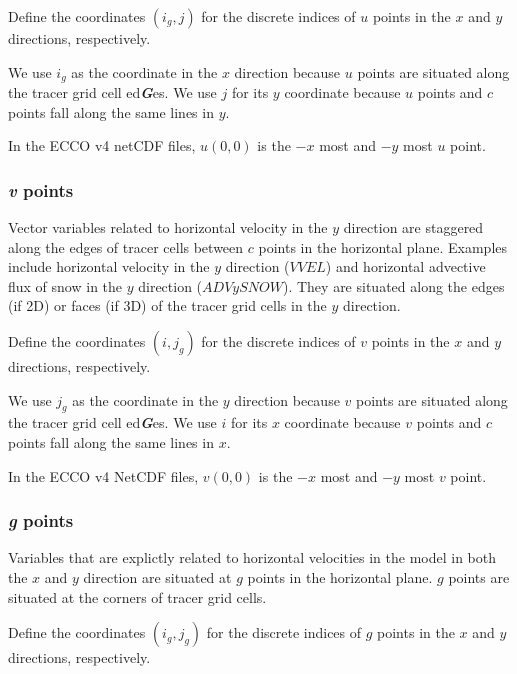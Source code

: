 \documentclass[11pt]{article}
\begin{document}
Define the coordinates \((i_g,j)\) for the discrete indices of \(u\)
points in the \(x\) and \(y\) directions, respectively.

We use \(i_g\) as the coordinate in the \(x\) direction because \(u\)
points are situated along the tracer grid cell ed\textbf{\emph{G}}es. We
use \(j\) for its \(y\) coordinate because \(u\) points and \(c\) points
fall along the same lines in \(y\).

In the ECCO v4 netCDF files, \(u(0,0)\) is the \(-x\) most and \(-y\)
most \(u\) point.

\subsubsection{\texorpdfstring{\emph{v}
points}{v points}}\label{v-points}

Vector variables related to horizontal velocity in the \(y\) direction
are staggered along the edges of tracer cells between \(c\) points in
the horizontal plane. Examples include horizontal velocity in the \(y\)
direction (\(VVEL\)) and horizontal advective flux of snow in the \(y\)
direction (\(ADVySNOW\)). They are situated along the edges (if 2D) or
faces (if 3D) of the tracer grid cells in the \(y\) direction.

Define the coordinates \((i,j_g)\) for the discrete indices of \(v\)
points in the \(x\) and \(y\) directions, respectively.

We use \(j_g\) as the coordinate in the \(y\) direction because \(v\)
points are situated along the tracer grid cell ed\textbf{\emph{G}}es. We
use \(i\) for its \(x\) coordinate because \(v\) points and \(c\) points
fall along the same lines in \(x\).

In the ECCO v4 NetCDF files, \(v(0,0)\) is the \(-x\) most and \(-y\)
most \(v\) point.

\subsubsection{\texorpdfstring{\emph{g}
points}{g points}}\label{g-points}

Variables that are explictly related to horizontal velocities in the
model in both the \(x\) and \(y\) direction are situated at \(g\) points
in the horizontal plane. \(g\) points are situated at the corners of
tracer grid cells.

Define the coordinates \((i_g,j_g)\) for the discrete indices of \(g\)
points in the \(x\) and \(y\) directions, respectively.
\end{document}
